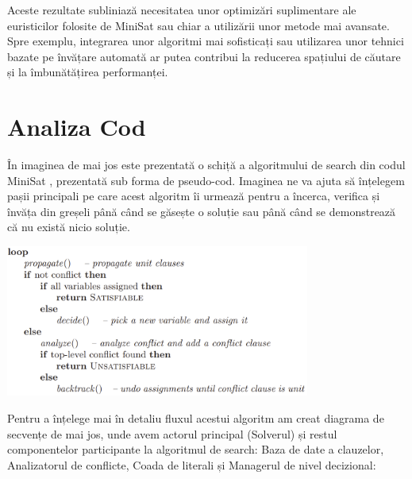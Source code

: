\documentclass[runningheads]{llncs}
\begin{document}
Aceste rezultate subliniază necesitatea unor optimizări suplimentare ale euristicilor folosite de MiniSat sau chiar a utilizării unor metode mai avansate. Spre exemplu, integrarea unor algoritmi mai sofisticați sau utilizarea unor tehnici bazate pe învățare automată ar putea contribui la reducerea spațiului de căutare și la îmbunătățirea performanței.

\section{Analiza Cod}

În imaginea de mai jos este prezentată o schiță a algoritmului de search din codul MiniSat \cite{minisatgithub} , prezentată sub forma de pseudo-cod. Imaginea ne va ajuta să înțelegem pașii principali pe care acest algoritm îi urmează pentru a încerca, verifica și învăța din greșeli până când se găsește o soluție sau până când se demonstrează că nu există nicio soluție.

\begin{center} \includegraphics[width=0.75\textwidth]{images/diagrams/pseudo_code/search_pseudo.png} \end{center}

Pentru a înțelege mai în detaliu fluxul acestui algoritm am creat diagrama de secvențe de mai jos, unde avem actorul principal (Solverul) și restul componentelor participante la algoritmul de search: Baza de date a clauzelor, Analizatorul de conflicte, Coada de literali și Managerul de nivel decizional:
\end{document}

